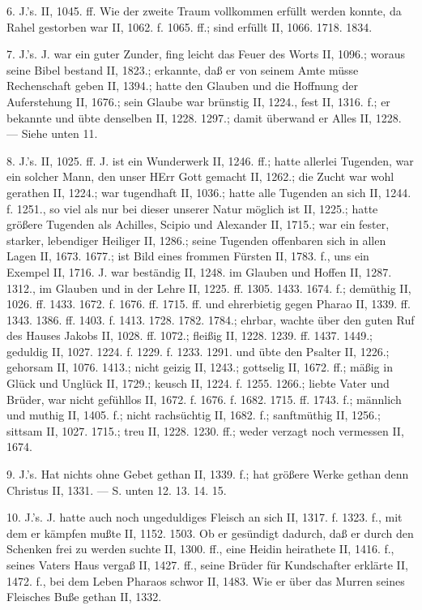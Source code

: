 6.  J.’s. II, 1045. ff. Wie der zweite Traum vollkommen erfüllt werden konnte, da Rahel gestorben war II, 1062. f. 1065. ff.; sind erfüllt II, 1066. 1718. 1834.

7.  J.’s. J. war ein guter Zunder, fing leicht das Feuer des Worts II, 1096.; woraus seine Bibel bestand II, 1823.; erkannte, daß er von seinem Amte müsse Rechenschaft geben II, 1394.; hatte den Glauben und die Hoffnung der Auferstehung II, 1676.; sein Glaube war brünstig II, 1224., fest II, 1316. f.; er bekannte und übte denselben II, 1228. 1297.; damit überwand er Alles II, 1228. — Siehe unten 11.

8.  J.’s. II, 1025. ff. J. ist ein Wunderwerk II, 1246. ff.; hatte allerlei Tugenden, war ein solcher Mann, den unser HErr Gott gemacht II, 1262.; die Zucht war wohl gerathen II, 1224.; war tugendhaft II, 1036.; hatte alle Tugenden an sich II, 1244. f. 1251., so viel als nur bei dieser unserer Natur möglich ist II, 1225.; hatte größere Tugenden als Achilles, Scipio und Alexander II, 1715.; war ein fester, starker, lebendiger Heiliger II, 1286.; seine Tugenden offenbaren sich in allen Lagen II, 1673. 1677.; ist Bild eines frommen Fürsten II, 1783. f., uns ein Exempel II, 1716. J. war beständig II, 1248. im Glauben und Hoffen II, 1287. 1312., im Glauben und in der Lehre II, 1225. ff. 1305. 1433. 1674. f.; demüthig II, 1026. ff. 1433. 1672. f. 1676. ff. 1715. ff. und ehrerbietig gegen Pharao II, 1339. ff. 1343. 1386. ff. 1403. f. 1413. 1728. 1782. 1784.; ehrbar, wachte über den guten Ruf des Hauses Jakobs II, 1028. ff. 1072.; fleißig II, 1228. 1239. ff. 1437. 1449.; geduldig II, 1027. 1224. f. 1229. f. 1233. 1291. und übte den Psalter II, 1226.; gehorsam II, 1076. 1413.; nicht geizig II, 1243.; gottselig II, 1672. ff.; mäßig in Glück und Unglück II, 1729.; keusch II, 1224. f. 1255. 1266.; liebte Vater und Brüder, war nicht gefühllos II, 1672. f. 1676. f. 1682. 1715. ff. 1743. f.; männlich und muthig II, 1405. f.; nicht rachsüchtig II, 1682. f.; sanftmüthig II, 1256.; sittsam II, 1027. 1715.; treu II, 1228. 1230. ff.; weder verzagt noch vermessen II, 1674.

9.  J.’s. Hat nichts ohne Gebet gethan II, 1339. f.; hat größere Werke gethan denn Christus II, 1331. — S. unten 12. 13. 14. 15.

10.  J.’s. J. hatte auch noch ungeduldiges Fleisch an sich II, 1317. f. 1323. f., mit dem er kämpfen mußte II, 1152. 1503. Ob er gesündigt dadurch, daß er durch den Schenken frei zu werden suchte II, 1300. ff., eine Heidin heirathete II, 1416. f., seines Vaters Haus vergaß II, 1427. ff., seine Brüder für Kundschafter erklärte II, 1472. f., bei dem Leben Pharaos schwor II, 1483. Wie er über das Murren seines Fleisches Buße gethan II, 1332.

